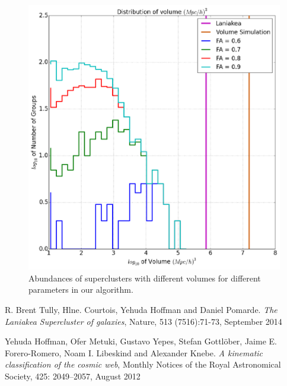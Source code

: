 \documentclass[preprint,proceedings]{rmaa}
\begin{document}
\begin{figure}[!t]
  \includegraphics[width=\columnwidth]{SDHernandez_Final_Fig1}
  \caption{Abundances of superclusters with different volumes for
    different parameters in our algorithm.}
  \label{fig:simple}
\end{figure}


\begin{thebibliography}

 R. Brent Tully, Hlne. Courtois, Yehuda Hoffman and Daniel Pomarde. 
{\em The Laniakea Supercluster of galaxies}, Nature, 513 (7516):71-73, September 2014 
 
 Yehuda Hoffman, Ofer Metuki, Gustavo Yepes, Stefan Gottlöber, Jaime E. Forero-Romero, Noam I. Libeskind and Alexander Knebe. 
{\em A kinematic classification of the cosmic web}, Monthly Notices of the Royal Astronomical Society, 425: 2049–2057, August 2012

  
\end{thebibliography}
\end{document}
